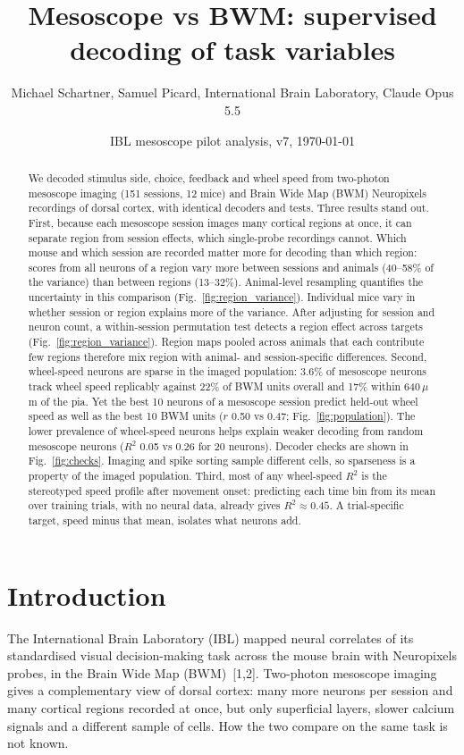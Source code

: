 \documentclass[10pt]{article}
\title{Mesoscope vs BWM: supervised decoding of task variables}
\author{Michael Schartner, Samuel Picard, International Brain Laboratory, Claude Opus 5.5}
\date{IBL mesoscope pilot analysis, v7, \today}
\newcommand{\um}{\,$\mu$m}
\newcommand{\figref}[1]{Fig.~\ref{fig:#1}}
\begin{document}
\maketitle

\begin{abstract}
\noindent We decoded stimulus side, choice, feedback and wheel speed from two-photon mesoscope imaging (151 sessions, 12 mice) and Brain Wide Map (BWM) Neuropixels recordings of dorsal cortex, with identical decoders and tests. Three results stand out. First, because each mesoscope session images many cortical regions at once, it can separate region from session effects, which single-probe recordings cannot. Which mouse and which session are recorded matter more for decoding than which region: scores from all neurons of a region vary more between sessions and animals (40--58\% of the variance) than between regions (13--32\%). Animal-level resampling quantifies the uncertainty in this comparison (\figref{region_variance}). Individual mice vary in whether session or region explains more of the variance. After adjusting for session and neuron count, a within-session permutation test detects a region effect across targets (\figref{region_variance}). Region maps pooled across animals that each contribute few regions therefore mix region with animal- and session-specific differences. Second, wheel-speed neurons are sparse in the imaged population: 3.6\% of mesoscope neurons track wheel speed replicably against 22\% of BWM units overall and 17\% within 640\um{} of the pia. Yet the best 10 neurons of a mesoscope session predict held-out wheel speed as well as the best 10 BWM units ($r$ 0.50 vs 0.47; Fig.~\ref{fig:population}). The lower prevalence of wheel-speed neurons helps explain weaker decoding from random mesoscope neurons ($R^2$ 0.05 vs 0.26 for 20 neurons). Decoder checks are shown in \figref{checks}. Imaging and spike sorting sample different cells, so sparseness is a property of the imaged population. Third, most of any wheel-speed $R^2$ is the stereotyped speed profile after movement onset: predicting each time bin from its mean over training trials, with no neural data, already gives $R^2 \approx 0.45$. A trial-specific target, speed minus that mean, isolates what neurons add.
\end{abstract}

\section*{Introduction}
The International Brain Laboratory (IBL) mapped neural correlates of its standardised visual decision-making task across the mouse brain with Neuropixels probes, in the Brain Wide Map (BWM)~[1,2]. Two-photon mesoscope imaging gives a complementary view of dorsal cortex: many more neurons per session and many cortical regions recorded at once, but only superficial layers, slower calcium signals and a different sample of cells. How the two compare on the same task is not known.
\end{document}
